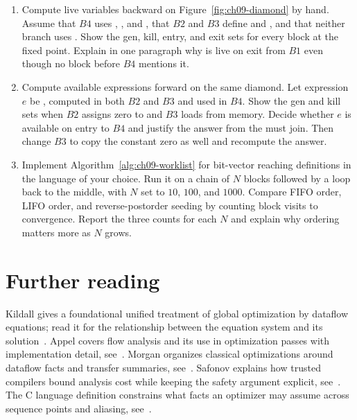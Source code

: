 \begin{enumerate}
\item \label{ex:ch09-live-diamond} Compute live variables backward on Figure~\ref{fig:ch09-diamond} by hand.
Assume that $B4$ uses , , and , that $B2$ and $B3$ define  and , and that neither branch uses .
Show the gen, kill, entry, and exit sets for every block at the fixed point.
Explain in one paragraph why  is live on exit from $B1$ even though no block before $B4$ mentions it.
\item \label{ex:ch09-available-kill} Compute available expressions forward on the same diamond.
Let expression $e$ be , computed in both $B2$ and $B3$ and used in $B4$.
Show the gen and kill sets when $B2$ assigns zero to  and $B3$ loads  from memory.
Decide whether $e$ is available on entry to $B4$ and justify the answer from the must join.
Then change $B3$ to copy the constant zero as well and recompute the answer.
\item \label{ex:ch09-order-effect} Implement Algorithm~\ref{alg:ch09-worklist} for bit-vector reaching definitions in the language of your choice.
Run it on a chain of $N$ blocks followed by a loop back to the middle, with $N$ set to $10$, $100$, and $1000$.
Compare FIFO order, LIFO order, and reverse-postorder seeding by counting block visits to convergence.
Report the three counts for each $N$ and explain why ordering matters more as $N$ grows.
\end{enumerate}

\section{Further reading}
\label{sec:ch09-reading}

Kildall gives a foundational unified treatment of global optimization by dataflow equations; read it for the relationship between the equation system and its solution~\cite{kildall-1973-dataflow}.
Appel covers flow analysis and its use in optimization passes with implementation detail, see~\cite{appel-1998-modern}.
Morgan organizes classical optimizations around dataflow facts and transfer summaries, see~\cite{morgan-1998-optimizing}.
Safonov explains how trusted compilers bound analysis cost while keeping the safety argument explicit, see~\cite{safonov-2010-trustworthy}.
The C language definition constrains what facts an optimizer may assume across sequence points and aliasing, see~\cite{wg14-2011-c11}.
